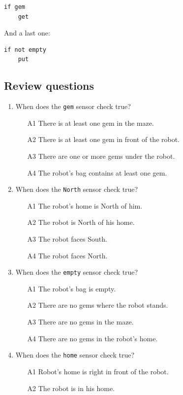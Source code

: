 {{{{\begin{verbatim}
if gem
    get
\end{verbatim}
And a last one:
 
\begin{verbatim}
if not empty
    put
\end{verbatim}

\subsection{Review questions}

\begin{enumerate}
\item When does the {\tt gem} sensor check true?
\begin{enumerate}
\item[A1] There is at least one gem in the maze.
\item[A2] There is at least one gem in front of the robot.
\item[A3] There are one or more gems under the robot.
\item[A4] The robot's bag contains at least one gem.
\end{enumerate}
\item When does the {\tt North} sensor check true?
\begin{enumerate}
\item[A1] The robot's home is North of him.
\item[A2] The robot is North of his home.
\item[A3] The robot faces South.
\item[A4] The robot faces North.
\end{enumerate}
\item When does the {\tt empty} sensor check true?
\begin{enumerate}
\item[A1] The robot's bag is empty.
\item[A2] There are no gems where the robot stands.
\item[A3] There are no gems in the maze.
\item[A4] There are no gems in the robot's home.
\end{enumerate}
\item When does the {\tt home} sensor check true?
\begin{enumerate}
\item[A1] Robot's home is right in front of the robot.
\item[A2] The robot is in his home.

\end{enumerate}
\end{enumerate}}}}}
